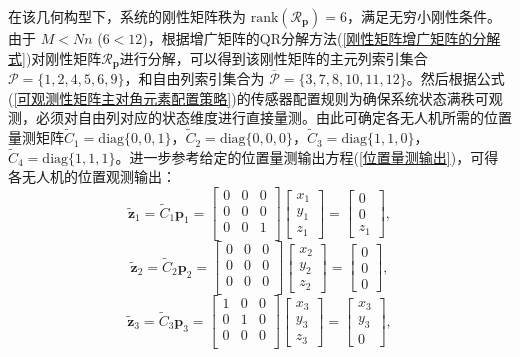 在该几何构型下，系统的刚性矩阵秩为 $\text{rank}(\mathcal{R}_{\mathbf{p}})=6$，满足无穷小刚性条件。由于 $M<Nn$ ($6<12$)，根据增广矩阵的QR分解方法(\ref{刚性矩阵增广矩阵的分解式})对刚性矩阵$\mathcal{R}_{\mathbf{p}}$进行分解，可以得到该刚性矩阵的主元列索引集合 $\mathcal{P}=\{1,2,4,5,6,9\}$，和自由列索引集合为 $\overline{\mathcal{P}}=\{3,7,8,10,11,12\}$。然后根据公式(\ref{可观测性矩阵主对角元素配置策略})的传感器配置规则为确保系统状态满秩可观测，必须对自由列对应的状态维度进行直接量测。由此可确定各无人机所需的位置量测矩阵$\tilde{C}_{1}=\text{diag}\{0,0,1\}$，$\tilde{C}_{2}=\text{diag}\{0,0,0\}$，$\tilde{C}_{3}=\text{diag}\{1,1,0\}$，$\tilde{C}_{4}=\text{diag}\{1,1,1\}$。进一步参考给定的位置量测输出方程(\ref{位置量测输出})，可得各无人机的位置观测输出：
\begin{equation}
	\tilde{\mathbf{z}}_1 = 
	\tilde{C}_{1}\mathbf{p}_{1} = 
	\begin{bmatrix}
		0&0&0 \\
		0&0&0 \\
		0&0&1 \\
	\end{bmatrix}
	\begin{bmatrix}
		x_1 \\ y_1 \\ z_1
	\end{bmatrix} = 
	\begin{bmatrix}
		0 \\ 0 \\ z_1
	\end{bmatrix},
\end{equation}
\begin{equation}
	\tilde{\mathbf{z}}_2 = 
	\tilde{C}_{2}\mathbf{p}_{2} = 
	\begin{bmatrix}
		0&0&0 \\
		0&0&0 \\
		0&0&0 \\
	\end{bmatrix}
	\begin{bmatrix}
		x_2 \\ y_2 \\ z_2
	\end{bmatrix} = 
	\begin{bmatrix}
		0 \\ 0 \\ 0
	\end{bmatrix},
\end{equation}
\begin{equation}
	\tilde{\mathbf{z}}_3 = 
	\tilde{C}_{3}\mathbf{p}_{3} = 
	\begin{bmatrix}
		1&0&0 \\
		0&1&0 \\
		0&0&0 \\
	\end{bmatrix}
	\begin{bmatrix}
		x_3 \\ y_3 \\ z_3
	\end{bmatrix} = 
	\begin{bmatrix}
		x_3 \\ y_3 \\ 0
	\end{bmatrix},
\end{equation}
